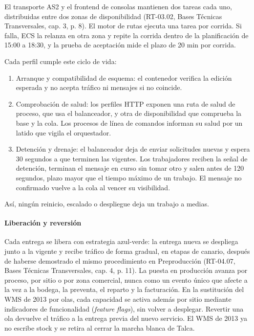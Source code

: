 El transporte AS2 y el frontend de consolas mantienen dos tareas cada uno, distribuidas entre dos zonas de disponibilidad (RT-03.02, Bases Técnicas Transversales, cap. 3, p. 8). El motor de rutas ejecuta una tarea por corrida. Si falla, ECS la relanza en otra zona y repite la corrida dentro de la planificación de 15:00 a 18:30, y la prueba de aceptación mide el plazo de 20 min por corrida.

Cada perfil cumple este ciclo de vida:

\begin{enumerate}
  \item Arranque y compatibilidad de esquema: el contenedor verifica la edición esperada y no acepta tráfico ni mensajes si no coincide.
  \item Comprobación de salud: los perfiles HTTP exponen una ruta de salud de proceso, que usa el balanceador, y otra de disponibilidad que comprueba la base y la cola. Los procesos de línea de comandos informan su salud por un latido que vigila el orquestador.
  \item Detención y drenaje: el balanceador deja de enviar solicitudes nuevas y espera 30 segundos a que terminen las vigentes. Los trabajadores reciben la señal de detención, terminan el mensaje en curso sin tomar otro y salen antes de 120 segundos, plazo mayor que el tiempo máximo de un trabajo. El mensaje no confirmado vuelve a la cola al vencer su visibilidad.
\end{enumerate}

Así, ningún reinicio, escalado o despliegue deja un trabajo a medias.

\paragraph{Liberación y reversión}
\label{subsec:liberacion-reversion}

Cada entrega se libera con estrategia azul-verde: la entrega nueva se despliega junto a la vigente y recibe tráfico de forma gradual, en etapas de canario, después de haberse demostrado el mismo procedimiento en Preproducción (RT-04.07, Bases Técnicas Transversales, cap. 4, p. 11). La puesta en producción avanza por proceso, por sitio o por zona comercial, nunca como un evento único que afecte a la vez a la bodega, la preventa, el reparto y la facturación. En la sustitución del WMS de 2013 por olas, cada capacidad se activa además por sitio mediante indicadores de funcionalidad (\emph{feature flags}), sin volver a desplegar. Revertir una ola devuelve el tráfico a la entrega previa del nuevo servicio. El WMS de 2013 ya no escribe stock y se retira al cerrar la marcha blanca de Talca.

